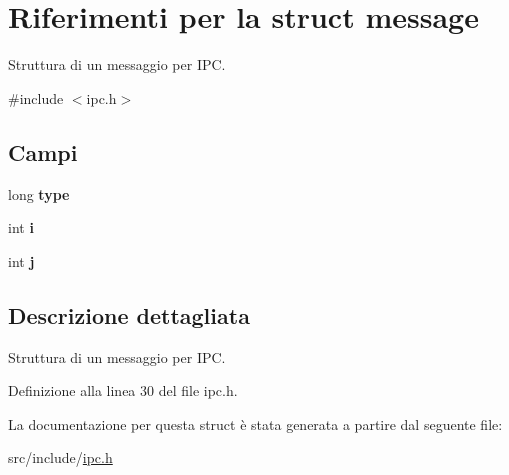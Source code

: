 \hypertarget{structmessage}{}\section{Riferimenti per la struct message}
\label{structmessage}


Struttura di un messaggio per I\+PC.  




{\ttfamily \#include $<$ipc.\+h$>$}

\subsection*{Campi}
\begin{DoxyCompactItemize}
\item 
\mbox{\label{structmessage_a1cdab6b2ccaa58f6554778dc58bca8cd}} 
long {\bfseries type}
\item 
\mbox{\label{structmessage_acc12b1ce17d5b271aa2beb81238ed395}} 
int {\bfseries i}
\item 
\mbox{\label{structmessage_acb62a617e8a3e6eac81ee2de85b91964}} 
int {\bfseries j}
\end{DoxyCompactItemize}


\subsection{Descrizione dettagliata}
Struttura di un messaggio per I\+PC. 

Definizione alla linea 30 del file ipc.\+h.



La documentazione per questa struct è stata generata a partire dal seguente file\+:\begin{DoxyCompactItemize}
\item 
src/include/\hyperlink{ipc_8h}{ipc.\+h}\end{DoxyCompactItemize}
